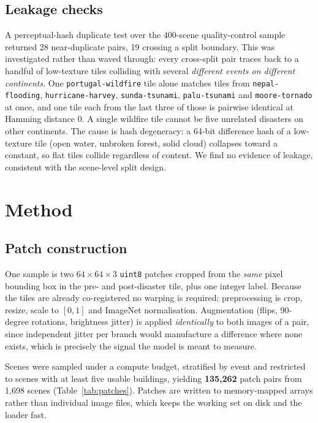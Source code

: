 \documentclass[10pt,twocolumn]{article}
\begin{document}
\subsection{Leakage checks}

A perceptual-hash duplicate test over the 400-scene quality-control sample returned 28 near-duplicate
pairs, 19 crossing a split boundary. This was investigated rather than waved through: every
cross-split pair traces back to a handful of low-texture tiles colliding with several \emph{different
events on different continents}. One \texttt{portugal-\allowbreak wildfire} tile alone matches tiles from
\texttt{nepal-flooding}, \texttt{hurricane-\allowbreak harvey}, \texttt{sunda-tsunami}, \texttt{palu-tsunami} and
\texttt{moore-tornado} at once, and one tile each from the last three of those is pairwise identical
at Hamming distance 0. A single wildfire tile cannot be five unrelated disasters on other continents.
The cause is hash degeneracy: a 64-bit difference hash of a low-texture tile (open water, unbroken
forest, solid cloud) collapses toward a constant, so flat tiles collide regardless of content. We find
no evidence of leakage, consistent with the scene-level split design.

\section{Method}

\subsection{Patch construction}

One sample is two $64\times64\times3$ \texttt{uint8} patches cropped from the \emph{same} pixel
bounding box in the pre- and post-disaster tile, plus one integer label. Because the tiles are
already co-registered no warping is required; preprocessing is crop, resize, scale to $[0,1]$ and
ImageNet normalisation. Augmentation (flips, 90-degree rotations, brightness jitter) is applied
\emph{identically} to both images of a pair, since independent jitter per branch would manufacture a
difference where none exists, which is precisely the signal the model is meant to measure.

Scenes were sampled under a compute budget, stratified by event and restricted to scenes with at
least five usable buildings, yielding \textbf{135,262} patch pairs from 1,698 scenes
(Table~\ref{tab:patches}). Patches are written to memory-mapped arrays rather than individual image
files, which keeps the working set on disk and the loader fast.
\end{document}
